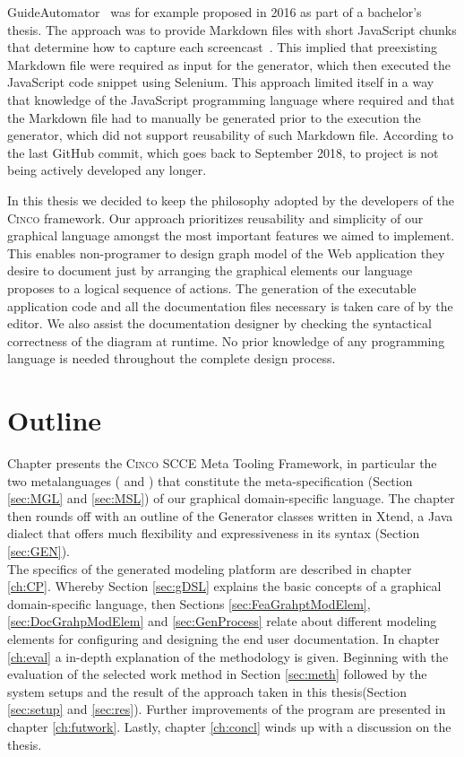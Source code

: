 GuideAutomator~\cite{oliveira2016guideautomator} was for example proposed in 2016 as part of a bachelor's thesis. The approach was to provide Markdown files with short JavaScript chunks that determine how to capture each screencast~\cite{guidAutomatorGitHub}. This implied that preexisting Markdown file were required as input for the generator, which then executed the JavaScript code snippet using Selenium. This approach limited itself in a way that knowledge of the JavaScript programming language where required and that the Markdown file had to manually be generated prior to the execution the generator, which did not support reusability of such Markdown file. According to the last GitHub commit, which goes back to September 2018, to project is not being actively developed any longer.

In this thesis we decided to keep the philosophy adopted by the developers of the \textsc{Cinco} framework. Our approach prioritizes reusability and simplicity of our graphical language amongst the most important features we aimed to implement. This enables non-programer to design graph model of the Web application they desire to document just by arranging the graphical elements our language proposes to a logical sequence of actions. The generation of the executable application code and all the documentation files necessary is taken care of by the editor. We also assist the documentation designer by checking the syntactical correctness of the diagram at runtime. No prior knowledge of any programming language is needed throughout the complete design process.

\section{Outline}\label{sec:outline}

Chapter  presents the \textsc{Cinco} SCCE Meta Tooling Framework, in particular the two metalanguages ( and ) that constitute the meta-specification (Section \ref{sec:MGL} and \ref{sec:MSL}) of our graphical domain-specific language. The chapter then rounds off with an outline of the Generator classes written in Xtend, a Java dialect that offers much flexibility and expressiveness in its syntax (Section \ref{sec:GEN}).\\The specifics of the generated modeling platform are described in chapter \ref{ch:CP}. Whereby Section \ref{sec:gDSL} explains the basic concepts of a graphical domain-specific language, then Sections \ref{sec:FeaGrahptModElem}, \ref{sec:DocGrahpModElem} and \ref{sec:GenProcess} relate about different modeling elements for configuring and designing the end user documentation. In chapter \ref{ch:eval} a in-depth explanation of the methodology is given. Beginning with the evaluation of the selected work method in Section \ref{sec:meth} followed by the system setups and the result of the approach taken in this thesis(Section \ref{sec:setup} and \ref{sec:res}). Further improvements of the program are presented in chapter \ref{ch:futwork}. Lastly, chapter \ref{ch:concl} winds up with a discussion on the thesis.